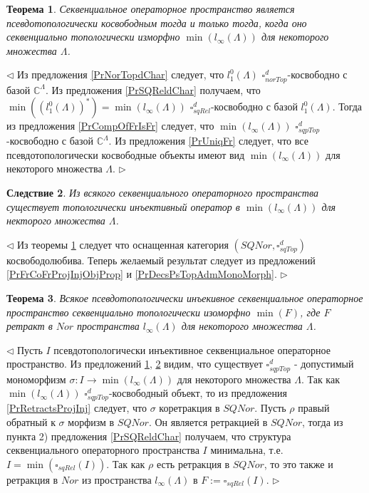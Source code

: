 \documentclass[12pt]{article}
\newtheorem{theorem}{Теорема}[subsection]
\newtheorem{corollary}[theorem]{Следствие}
\newenvironment{proof}{\par $\triangleleft$}{$\triangleright$}
\begin{document}
\begin{theorem}\label{ThPsTopCoFrDesc} 
Секвенциальное операторное пространство является псевдотопологически косвободным тогда и только тогда, когда оно секвенциально топологически изморфно $\min(l_\infty(\Lambda))$ для некоторого множества $\Lambda$.
\end{theorem}
\begin{proof}
Из предложения \ref{PrNorTopdChar} следует, что $l_1^0(\Lambda)$ $\square_{norTop}^d$-косвободно с базой $\mathbb{C}^\Lambda$. Из предложения \ref{PrSQReldChar} получаем, что $\min((l_1^0(\Lambda))^*)=\min(l_\infty(\Lambda))$ $\square_{sqRel}^d$-косвободно с базой 
$l_1^0(\Lambda)$. Тогда из предложения \ref{PrCompOfFrIsFr} следует, что $\min(l_\infty(\Lambda))$ $\square_{sqpTop}^d$-косвободно с базой $\mathbb{C}^\Lambda$. Из предложения \ref{PrUniqFr} следует, что все псевдотопологически 
косвободные объекты имеют вид $\min(l_\infty(\Lambda))$ для некоторого множества $\Lambda$. 
\end{proof}

\begin{corollary}\label{CorSQSpaceIsFromPsTopAdmMonoMorph}
Из всякого секвенциального операторного пространства существует топологически инъективный оператор в $\min(l_\infty(\Lambda))$ для некторого множества $\Lambda$.
\end{corollary}
\begin{proof}
Из теоремы \ref{ThPsTopCoFrDesc} следует что оснащенная категория $(SQNor,\square_{sqTop}^d)$ косвободолюбива. Теперь желаемый результат следует из предложений \ref{PrFrCoFrProjInjObjProp} и \ref{PrDecsPsTopAdmMonoMorph}.
\end{proof}

\begin{theorem}\label{ThPsTopInjDesc} 
Всякое псевдотопологически инъекивное секвенциальное операторное пространство секвенциально топологически изоморфно $\min(F)$, где $F$ ретракт в $Nor$ пространства $l_\infty(\Lambda)$ для некоторого множества $\Lambda$.
\end{theorem}
\begin{proof}
Пусть $I$ псевдотопологически инъективное секвенциальное операторное пространство. 
Из предложений \ref{ThPsTopCoFrDesc}, \ref{CorSQSpaceIsFromPsTopAdmMonoMorph} видим, что существует $\square_{sqpTop}^d$ - допустимый мономорфизм $\sigma:I\to\min(l_\infty(\Lambda))$ для некоторого множества $\Lambda$. Так как $\min(l_\infty(\Lambda))$ $\square_{sqpTop}^d$-косвободный объект, то из предложения \ref{PrRetractsProjInj} следует, что $\sigma$ коретракция в $SQNor$. Пусть $\rho$ правый обратный к $\sigma$ морфизм в $SQNor$. Он является ретракцией в $SQNor$, тогда из пункта 2) предложения \ref{PrSQReldChar} получаем, что структура секвенциального операторного пространства $I$ минимальна, т.е. $I=\min(\square_{sqRel}(I))$. Так как $\rho$ есть ретракция в $SQNor$, то это также и ретракция в $Nor$ из пространства $l_\infty(\Lambda)$ в $F:=\square_{sqRel}(I)$.
\end{proof}
\end{document}
